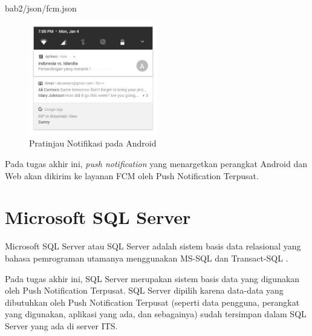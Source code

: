  {bab2/json/fcm.json}
\begin{figure}[H]
	\centering\includegraphics[width=0.5\textwidth]{bab2/img/fcm.jpg}
	\caption{Pratinjau Notifikasi pada Android}
	\label{img:contoh-hasil-fcm}
\end{figure}
\par Pada tugas akhir ini, \textit{push notification} yang menargetkan perangkat Android dan Web akan dikirim ke layanan FCM oleh Push Notification Terpusat.

\section{Microsoft SQL Server}
\par Microsoft SQL Server atau SQL Server adalah sistem basis data relasional yang bahasa pemrograman utamanya menggunakan MS-SQL dan Transact-SQL \cite{sqlserver-online}.
\par Pada tugas akhir ini, SQL Server merupakan sistem basis data yang digunakan oleh Push Notification Terpusat. SQL Server dipilih karena data-data yang dibutuhkan oleh Push Notification Terpusat (seperti data pengguna, perangkat yang digunakan, aplikasi yang ada, dan sebagainya) sudah tersimpan dalam SQL Server yang ada di server ITS.

